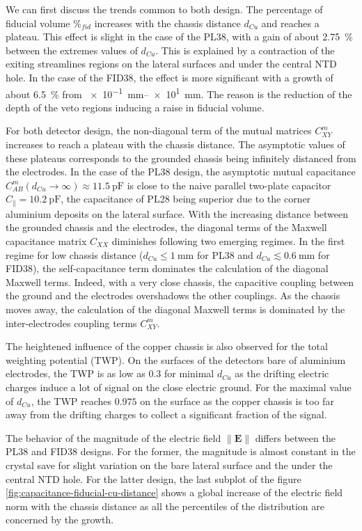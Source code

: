 We can first discuss the trends common to both design. 
The percentage of fiducial volume $\%_{fid}$ increases with the chassis distance $d_{Cu}$ and reaches a plateau. This effect is slight in the case of the PL38, with a gain of about \SI{2.75}{\percent} between the extremes values of $d_{Cu}$. This is explained by a contraction of the exiting streamlines regions on the lateral surfaces and under the central NTD hole. In the case of the FID38, the effect is more significant with a growth of about \SI{6.5}{\percent} from \SIrange{e-1}{e1}{\mm}. The reason is the reduction of the depth of the veto regions inducing a raise in fiducial volume.

For both detector design, the non-diagonal term of the mutual matrices $C_{XY}^m$ increases to reach a plateau with the chassis distance. The asymptotic values of these plateaus corresponds to the grounded chassis being infinitely distanced from the electrodes. In the case of the PL38 design, the asymptotic mutual capacitance $C_{AB}^m(d_{Cu} \to \infty) \approx \SI{11.5}{\pico\farad}$ is close to the naive parallel two-plate capacitor $C_{\parallel} = \SI{10.2}{\pico\farad}$, the capacitance of PL28 being superior due to the corner aluminium deposits on the lateral surface. With the increasing distance between the grounded chassis and the electrodes, the diagonal terms of the Maxwell capacitance matrix $C_{XX}$ diminishes following two emerging regimes. In the first regime for low chassis distance ($d_{Cu} \leq \SI{1}{\mm}$ for PL38 and $d_{Cu} \lesssim \SI{0.6}{\mm}$ for FID38), the self-capacitance term dominates the calculation of the diagonal Maxwell terms. Indeed, with a very close chassis, the capacitive coupling between the ground and the electrodes overshadows the other couplings. As the chassis moves away, the calculation of the diagonal Maxwell terms is dominated by the inter-electrodes coupling terms $C_{XY}^m$. 

The heightened influence of the copper chassis is also observed for the total weighting potential (TWP). On the surfaces of the detectors bare of aluminium electrodes, the TWP is as low as $0.3$ for minimal $d_{Cu}$ as the drifting electric charges induce a lot of signal on the close electric ground. For the maximal value of $d_{Cu}$, the TWP reaches $0.975$ on the surface as the copper chassis is too far away from the drifting charges to collect a significant fraction of the signal.

The behavior of the magnitude of the electric field $\| \mathbf{E} \|$ differs between the PL38 and FID38 designs. For the former, the magnitude is almost constant in the crystal save for slight variation on the bare lateral surface and the under the central NTD hole. For the latter design, the last subplot of the figure \ref{fig:capacitance-fiducial-cu-distance} shows a global increase of the electric field norm with the chassis distance as all the percentiles of the distribution are concerned by the growth.

